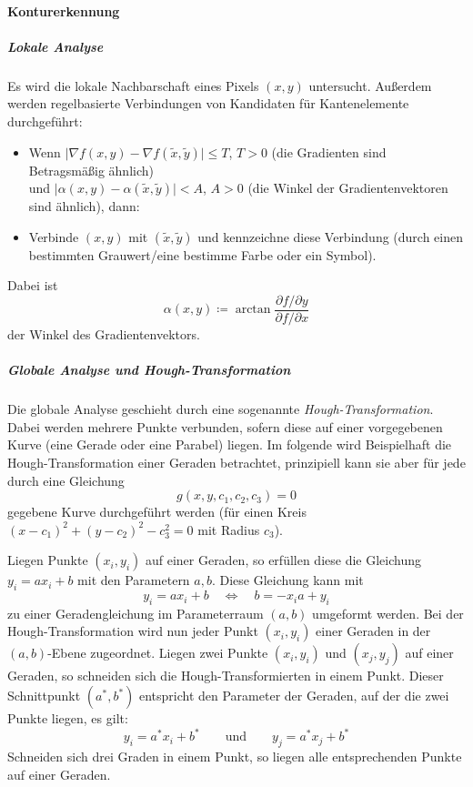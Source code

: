 				\paragraph{Konturerkennung}
					\subparagraph{Lokale Analyse}
						Es wird die lokale Nachbarschaft eines Pixels \( (x, y) \) untersucht. Außerdem werden regelbasierte Verbindungen von Kandidaten für Kantenelemente durchgeführt:
						\begin{itemize}
							\item Wenn \( \big\lvert \nabla f(x, y) - \nabla f(\tilde{x}, \tilde{y}) \big\rvert \leq T \), \( T > 0 \) (die Gradienten sind Betragsmäßig ähnlich) \\ und \( \big\lvert \alpha(x, y) - \alpha(\tilde{x}, \tilde{y}) \big\rvert < A \), \( A > 0 \) (die Winkel der Gradientenvektoren sind ähnlich), dann:
							\item Verbinde \( (x, y) \) mit \( (\tilde{x}, \tilde{y}) \) und kennzeichne diese Verbindung (\zB durch einen bestimmten Grauwert/eine bestimme Farbe oder ein Symbol).
						\end{itemize}
						Dabei ist
						\begin{equation*}
							\alpha(x, y) \coloneqq \arctan \frac{\partial f / \partial y}{\partial f / \partial x}
						\end{equation*}
						der Winkel des Gradientenvektors.

					\subparagraph{Globale Analyse und Hough-Transformation}
						Die globale Analyse geschieht durch eine sogenannte \emph{Hough-Transformation}. Dabei werden mehrere Punkte verbunden, sofern diese auf einer vorgegebenen Kurve (\zB eine Gerade oder eine Parabel) liegen. Im folgende wird Beispielhaft die Hough-Transformation \bzgl einer Geraden betrachtet, prinzipiell kann sie aber für jede durch eine Gleichung
						\begin{equation*}
							g(x, y, c_1, c_2, c_3) = 0
						\end{equation*}
						gegebene Kurve durchgeführt werden (\zB für einen Kreis \( (x - c_1)^2 + (y - c_2)^2 - c_3^2 = 0 \) mit Radius \( c_3 \)).

						Liegen Punkte \( (x_i, y_i) \) auf einer Geraden, so erfüllen diese die Gleichung \( y_i = ax_i + b \) mit den Parametern \(a, b\). Diese Gleichung kann mit
						\begin{equation*}
							y_i = ax_i + b \quad\iff\quad b = -x_ia + y_i
						\end{equation*}
						zu einer Geradengleichung im Parameterraum \( (a, b) \) umgeformt werden. Bei der Hough-Transformation wird nun jeder Punkt \( (x_i, y_i) \) einer Geraden in der \( (a, b) \)-Ebene zugeordnet. Liegen zwei Punkte \( (x_i, y_i) \) und \( (x_j, y_j) \) auf einer Geraden, so schneiden sich die Hough-Transformierten in einem Punkt. Dieser Schnittpunkt \( (a^\ast, b^\ast) \) entspricht den Parameter der Geraden, auf der die zwei Punkte liegen, \dh es gilt:
						\begin{equation*}
							y_i = a^\ast x_i + b^\ast \quad\quad\text{und}\quad\quad y_j = a^\ast x_j + b^\ast
						\end{equation*}
						Schneiden sich drei Graden in einem Punkt, so liegen alle entsprechenden Punkte auf einer Geraden.

